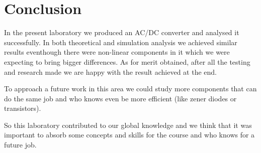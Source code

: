 \newpage
\section{Conclusion}
\label{sec:conclusion}

In the present laboratory we produced an AC/DC converter and analysed it successfully. In both theoretical and simulation analysis 
we achieved similar results eventhough there were non-linear components in it which we were expecting to bring bigger differences. As for merit obtained, after all the testing 
and research made we are happy with the result achieved at the end. 

To approach a future work in this area we could study more components that can do the same job and who knows even be more efficient (like zener diodes or transistors).

So this laboratory contributed to our global knowledge and we think that it was important to absorb some concepts and skills for the course and who knows for a future job. 

